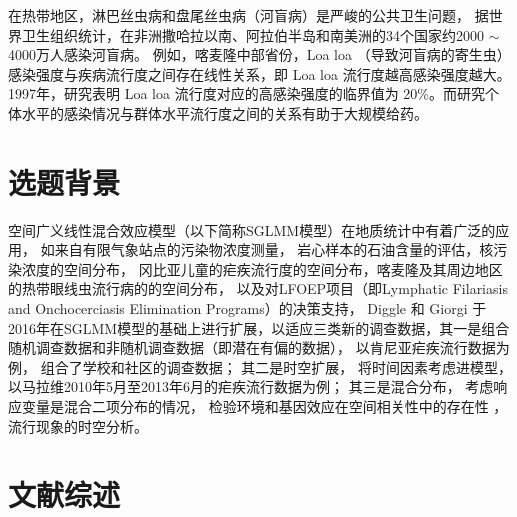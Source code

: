 \documentclass[hyperref, a4paper, UTF8, zihao = -4, linespread = 1.25, scheme = chinese]{ctexbook}
\begin{document}
在热带地区，淋巴丝虫病和盘尾丝虫病（河盲病）是严峻的公共卫生问题，
据世界卫生组织统计，在非洲撒哈拉以南、阿拉伯半岛和南美洲的34个国家约2000
\(\sim\) 4000万人感染河盲病\citep{Takougang2002Rapid}。
例如，喀麦隆中部省份，Loa loa
（导致河盲病的寄生虫）感染强度与疾病流行度之间存在线性关系，即 Loa loa
流行度越高感染强度越大\citep{Boussinesq2001}。1997年，研究表明 Loa loa
流行度对应的高感染强度的临界值为
20\%\citep{Gardon1997Serious}。而研究个体水平的感染情况与群体水平流行度之间的关系有助于大规模给药\citep{Schl2016Using}。

\section{选题背景}

空间广义线性混合效应模型（以下简称SGLMM模型）在地质统计中有着广泛的应用，
如来自有限气象站点的污染物浓度测量，
岩心样本的石油含量的评估，核污染浓度的空间分布\citep{Diggle1998}，
冈比亚儿童的疟疾流行度的空间分布\citep{Diggle2002}，喀麦隆及其周边地区的热带眼线虫流行病的的空间分布\citep{Diggle2007ATMP}，
以及对LFOEP项目（即Lymphatic Filariasis and Onchocerciasis Elimination
Programs）的决策支持\citep{Schl2016Using}， Diggle 和 Giorgi
于2016年在SGLMM模型的基础上进行扩展，以适应三类新的调查数据，其一是组合随机调查数据和非随机调查数据（即潜在有偏的数据），
以肯尼亚疟疾流行数据为例， 组合了学校和社区的调查数据； 其二是时空扩展，
将时间因素考虑进模型， 以马拉维2010年5月至2013年6月的疟疾流行数据为例；
其三是混合分布， 考虑响应变量是混合二项分布的情况\citep{Diggle2016}，
检验环境和基因效应在空间相关性中的存在性 \citep{spaMM2014}，
流行现象的时空分析\citep{surveillance2017}。

\section{文献综述}
\end{document}

